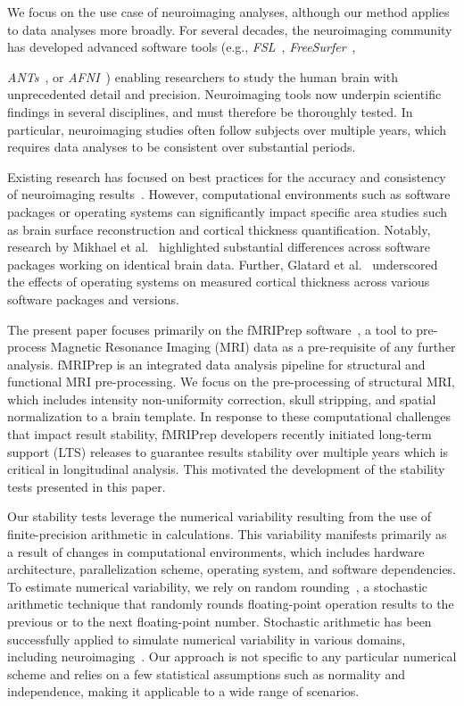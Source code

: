 \documentclass[lettersize,journal]{IEEEtran}
\begin{document}
We focus on the use case of neuroimaging analyses, although our method applies to data analyses more broadly. For several decades, the neuroimaging community has developed advanced software tools (e.g., \emph{FSL}~\cite{jenkinson2012fsl}, \emph{FreeSurfer}~\cite{fischl2012freesurfer}, {\emph{ANTs}~\cite{avants2009advanced}, or \emph{AFNI}~\cite{COX1996162}) enabling researchers to study the human brain with unprecedented detail and precision. Neuroimaging tools now underpin scientific findings in several disciplines, and must therefore be thoroughly tested. In particular, neuroimaging studies often follow subjects over multiple years, which requires data analyses to be consistent over substantial periods.

Existing research has focused on best practices for the accuracy and consistency of neuroimaging results~\cite{tustison2013instrumentation}. However, computational environments such as software packages or operating systems can significantly impact specific area studies such as brain surface reconstruction and cortical thickness quantification. Notably, research by Mikhael et al.~\cite{mikhael2019controlled} highlighted substantial differences across software packages working on identical brain data. Further, Glatard et al.~\cite{glatard2015reproducibility} underscored the effects of operating systems on measured cortical thickness across various software packages and versions.

The present paper focuses primarily on the fMRIPrep software~\cite{esteban2019fmriprep}, a tool to pre-process Magnetic Resonance Imaging (MRI) data as a pre-requisite of any further analysis. fMRIPrep is an integrated data analysis pipeline for structural and functional MRI pre-processing. We focus on the pre-processing of structural MRI, which includes intensity non-uniformity correction, skull stripping, and spatial normalization to a brain template. In response to these computational challenges that impact result stability, fMRIPrep developers recently initiated long-term support (LTS) releases to guarantee results stability over multiple years which is critical in longitudinal analysis. This motivated the development of the stability tests presented in this paper.

Our stability tests leverage the numerical variability resulting from the use of finite-precision arithmetic in calculations. This variability manifests primarily as a result of changes in computational environments, which includes hardware architecture, parallelization scheme, operating system, and software dependencies. To estimate numerical variability, we rely on random rounding~\cite{forsythe1959reprint}, a stochastic arithmetic technique that randomly rounds floating-point operation results to the previous or to the next floating-point number. Stochastic arithmetic has been successfully applied to simulate numerical variability in various domains, including neuroimaging~\cite{salari2021accurate,kiar2021numerical}. Our approach is not specific to any particular numerical scheme and relies on a few statistical assumptions such as normality and independence, making it applicable to a wide range of scenarios.

}
\end{document}
